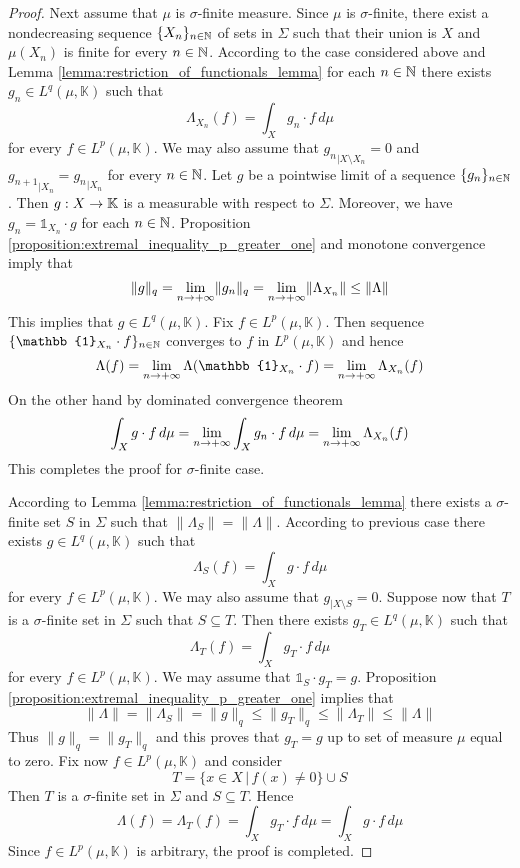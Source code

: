 \begin{proof}
  Next assume that $\mu$ is $\sigma$-finite measure. Since $\mu$ is $\sigma$-finite, there exist a nondecreasing sequence $\{X_n\}_{n\in {\mathbb N}}$ of sets in $\Sigma$ such that their union is $X$ and $\mu(X_n)$ is finite for every $n\in {\mathbb N}$. According to the case considered above and Lemma \ref{lemma:restriction_of_functionals_lemma} for each $n \in {\mathbb N}$ there exists $g_n\in L^q(\mu,\mathbb{K})$ such that
  $$\Lambda_{X_n}\left(f\right) = \int_Xg_n\cdot f\,d\mu$$
  for every $f \in L^p(\mu,\mathbb{K})$. We may also assume that ${g_n}_{\mid X\setminus X_n} = 0$ and ${g_{n+1}}_{\mid X_n} = {g_n}_{\mid X_n}$ for every $n \in {\mathbb N}$. Let $g$ be a pointwise limit of a sequence $\{g_n\}_{n\in {\mathbb N}}$. Then $g:X\rightarrow \mathbb{K}$ is a measurable with respect to $\Sigma$. Moreover, we have $g_n = \mathbb{1}_{X_n}\cdot g$ for each $n \in {\mathbb N}$. Proposition \ref{proposition:extremal_inequality_p_greater_one} and monotone convergence imply that
  $$\lVert g \rVert_q = \lim_{n\rightarrow +\infty}\lVert g_n\rVert_q = \lim_{n\rightarrow +\infty}\lVert \Lambda_{X_n} \rVert \leq \lVert \Lambda \rVert$$
  This implies that $g \in L^q(\mu,\mathbb{K})$. Fix $f \in L^p(\mu, \mathbb{K})$. Then sequence $\{\mathbb{1}_{X_n}\cdot f\}_{n \in \NN}$ converges to $f$ in $L^p(\mu,\mathbb{K})$ and hence
  $$\Lambda(f) = \lim_{n\ra +\infty}\Lambda(\mathbb{1}_{X_n}\cdot f) = \lim_{n\ra +\infty}\Lambda_{X_n}(f)$$
  On the other hand by dominated convergence theorem
  $$\int_Xg\cdot f\,d\mu = \lim_{n\rightarrow +\infty}\int_Xg_n\cdot f\,d\mu = \lim_{n\rightarrow +\infty}\Lambda_{X_n}(f)$$
  This completes the proof for $\sigma$-finite case.

  According to Lemma \ref{lemma:restriction_of_functionals_lemma} there exists a $\sigma$-finite set $S$ in $\Sigma$ such that $\lVert \Lambda_S \rVert = \lVert \Lambda \rVert$. According to previous case there exists $g \in L^q(\mu,\mathbb{K})$ such that
  $$\Lambda_S(f) = \int_Xg\cdot f\,d\mu$$
  for every $f \in L^p(\mu,\mathbb{K})$. We may also assume that $g_{\mid X\setminus S} = 0$. Suppose now that $T$ is a $\sigma$-finite set in $\Sigma$ such that $S\subseteq T$. Then there exists $g_T \in L^q(\mu,\mathbb{K})$ such that
  $$\Lambda_{T}(f) = \int_Xg_T\cdot f\,d\mu$$
  for every $f \in L^p(\mu,\mathbb{K})$. We may assume that $\mathbb{1}_S \cdot g_T = g$. Proposition \ref{proposition:extremal_inequality_p_greater_one} implies that
  $$\lVert \Lambda \rVert = \lVert \Lambda_S \rVert = \lVert g \rVert_q \leq \lVert g_T \rVert_q \leq \lVert \Lambda_{T}\rVert \leq \lVert \Lambda \rVert$$
  Thus $\lVert g \rVert_q = \lVert g_T \rVert_q$ and this proves that $g_T = g$ up to set of measure $\mu$ equal to zero. Fix now $f \in L^p(\mu,\mathbb{K})$ and consider
  $$T = \big\{x\in X\,\big|\,f(x) \neq 0\big\} \cup S$$
  Then $T$ is a $\sigma$-finite set in $\Sigma$ and $S\subseteq T$. Hence
  $$\Lambda(f) = \Lambda_T(f) = \int_Xg_T\cdot f\,d\mu = \int_Xg\cdot f\,d\mu$$
  Since $f \in L^p(\mu,\mathbb{K})$ is arbitrary, the proof is completed.
\end{proof}

